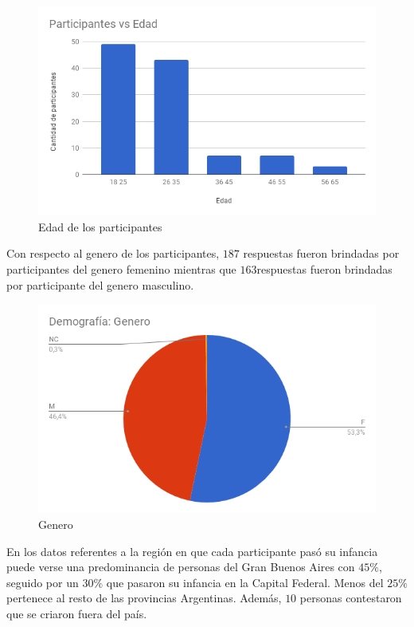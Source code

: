 \begin{figure}[htp]
\begin{center}
\includegraphics[scale=0.3]{datosDemograficos/edad.png}
\end{center}
\caption{Edad de los participantes}
\label{pics:blablabla}
\end{figure}


Con respecto al genero de los participantes, $187$ respuestas fueron brindadas por participantes del genero femenino mientras que $163$respuestas fueron brindadas por participante del genero masculino.


\begin{figure}[htp]
\begin{center}
\includegraphics[scale=0.3]{datosDemograficos/genero.png}
\end{center}
\caption{Genero}
\label{pics:blablabla}
\end{figure}


En los datos referentes a la región en que cada participante pasó su infancia puede verse una predominancia de personas del Gran Buenos Aires con $45\%$, seguido por un $30\%$ que pasaron su infancia en la Capital Federal. Menos del $25\%$ pertenece al resto de las provincias Argentinas. Además, $10$ personas contestaron que se criaron fuera del país.


